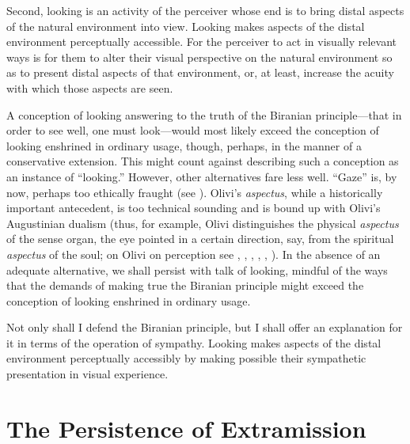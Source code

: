 Second, looking is an activity of the perceiver whose end is to bring distal aspects of the natural environment into view. Looking makes aspects of the distal environment perceptually accessible. For the perceiver to act in visually relevant ways is for them to alter their visual perspective on the natural environment so as to present distal aspects of that environment, or, at least, increase the acuity with which those aspects are seen. 

A conception of looking answering to the truth of the Biranian principle---that in order to see well, one must look---would most likely exceed the conception of looking enshrined in ordinary usage, though, perhaps, in the manner of a conservative extension. This might count against describing such a conception as an instance of ``looking.'' However, other alternatives fare less well. ``Gaze'' is, by now, perhaps too ethically fraught (see \citealt{Jay:1994aa}). Olivi's \emph{aspectus}, while a historically important antecedent, is too technical sounding and is bound up with Olivi's Augustinian dualism (thus, for example, Olivi distinguishes the physical \emph{aspectus} of the sense organ, the eye pointed in a certain direction, say, from the spiritual \emph{aspectus} of the soul; on Olivi on perception see \citealt[3--26, 39--54]{Tachau:1988aa}, \citealt[215--224]{Spruit:1994qq}, \citealt[121--124, 130--134, 168--181]{Pasnau:1997aa}, \citealt[part 1]{Toivanen:2009zf}, \citealt{Silva:2010zh}, \citealt[part 2]{Toivanen:2013ul}). In the absence of an adequate alternative, we shall persist with talk of looking, mindful of the ways that the demands of making true the Biranian principle might exceed the conception of looking enshrined in ordinary usage.

Not only shall I defend the Biranian principle, but I shall offer an explanation for it in terms of the operation of sympathy. Looking makes aspects of the distal environment perceptually accessibly by making possible their sympathetic presentation in visual experience.


\section{The Persistence of Extramission} %
\label{sec:the_persistence_of_extramission}

